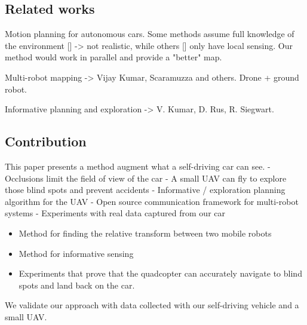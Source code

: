 \subsection{Related works}

Motion planning for autonomous cars. Some methods assume full knowledge of the environment [] -> not realistic, while others [] only have local sensing. Our method would work in parallel and provide a "better" map.

Multi-robot mapping -> Vijay Kumar, Scaramuzza and others. Drone + ground robot.

Informative planning and exploration -> V. Kumar, D. Rus, R. Siegwart.

\subsection{Contribution}

This paper presents a method augment what a self-driving car can see.
- Occlusions limit the field of view of the car
- A small UAV can fly to explore those blind spots and prevent accidents
- Informative / exploration planning algorithm for the UAV
- Open source communication framework for multi-robot systems
- Experiments with real data captured from our car 

\begin{itemize}
\item
Method for finding the relative transform between two mobile robots
\item
Method for informative sensing
\item
Experiments that prove that the quadcopter can accurately navigate
to blind spots and land back on the car.
\end{itemize}

We validate our approach with data collected with our self-driving vehicle and a small UAV.
